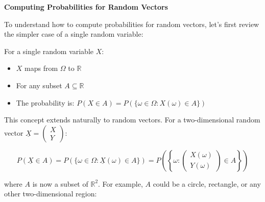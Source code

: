 \documentclass{article}
\begin{document}
    \textbf{Computing Probabilities for Random Vectors}

    To understand how to compute probabilities for random vectors, let's first review the simpler case of a single random variable:

    For a single random variable $X$:
    \begin{itemize}
        \item $X$ maps from $\Omega$ to $\mathbb{R}$
        \item For any subset $A \subseteq \mathbb{R}$
        \item The probability is: $P(X \in A) = P(\{\omega \in \Omega : X(\omega) \in A\})$
    \end{itemize}

    This concept extends naturally to random vectors. For a two-dimensional random vector $\underline{X} = \begin{pmatrix} X \\ Y \end{pmatrix}$:
    
    \[ P(\underline{X} \in A) = P(\{\omega \in \Omega : \underline{X}(\omega) \in A\}) = P\left(\left\{\omega : \begin{pmatrix} X(\omega) \\ Y(\omega) \end{pmatrix} \in A\right\}\right) \]

    where $A$ is now a subset of $\mathbb{R}^2$. For example, $A$ could be a circle, rectangle, or any other two-dimensional region:

    \begin{center}
    \end{center}
\end{document}
